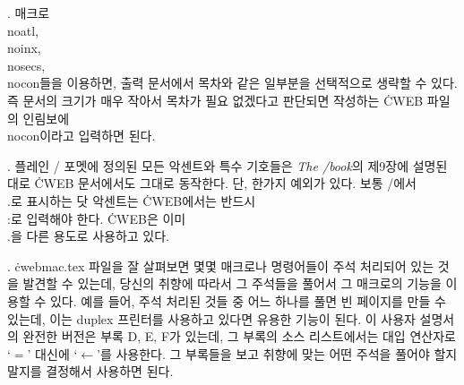 {%
. 매크로 \.{\\noatl}, \.{\\noinx}, \.{\\nosecs}, \.{\\nocon}들을
이용하면, 출력 문서에서 목차와 같은 일부분을 선택적으로 생략할 수
있다. 즉 문서의 크기가 매우 작아서 목차가 필요 없겠다고 판단되면
작성하는 \.{CWEB} 파일의 인림보에 \.{\\nocon}이라고 입력하면 된다.

. 플레인 \TEX/ 포멧에 정의된 모든 악센트와 특수
기호들은 {\sl The \TEX/book\/}의 제9장에 설명된 대로 \.{CWEB}
문서에서도 그대로 동작한다. 단, 한가지 예외가 있다.
보통 \TEX/에서 \.{\\.}로 표시하는 닷 악센트는 \.{CWEB}에서는 반드시
\.{\\:}로 입력해야 한다. \.{CWEB}은 이미 \.{\\.}을 다른 용도로 사용하고 있다.

. \.{cwebmac.tex} 파일을 잘 살펴보면 몇몇 매크로나
명령어들이 주석 처리되어 있는 것을 발견할 수 있는데, 당신의 취향에
따라서 그 주석들을 풀어서 그 매크로의 기능을 이용할 수 있다. 예를 들어, 주석 처리된
것들 중 어느 하나를 풀면 빈 페이지를 만들 수 있는데, 이는 duplex
프린터를 사용하고 있다면 유용한 기능이 된다. 이 사용자 설명서의 완전한
버전은 부록 D, E, F가 있는데, 그 부록의 소스 리스트에서는 대입
연산자로 `$=$' 대신에 `$\gets$'를 사용한다. 그 부록들을 보고 취향에
맞는 어떤 주석을 풀어야 할지 말지를 결정해서 사용하면 된다.

}
